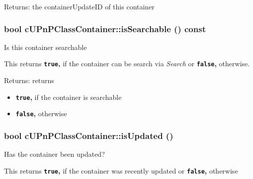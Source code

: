 \begin{Desc}
\item[Returns:]the containerUpdateID of this container \end{Desc}
\hypertarget{classcUPnPClassContainer_c6d1de26df91d64379a9a2db1f5a7301}{
\subsubsection[{isSearchable}]{\setlength{\rightskip}{0pt plus 5cm}bool cUPnPClassContainer::isSearchable () const}}
\label{classcUPnPClassContainer_c6d1de26df91d64379a9a2db1f5a7301}


Is this container searchable

This returns {\bf {\tt true},} if the container can be search via {\em Search\/} or {\bf {\tt false},} otherwise.

\begin{Desc}
\item[Returns:]returns\begin{itemize}
\item {\bf {\tt true},} if the container is searchable\item {\bf {\tt false},} otherwise \end{itemize}
\end{Desc}
\hypertarget{classcUPnPClassContainer_a8ae4e790074d3a34bc7ec173a02595a}{
\subsubsection[{isUpdated}]{\setlength{\rightskip}{0pt plus 5cm}bool cUPnPClassContainer::isUpdated ()}}
\label{classcUPnPClassContainer_a8ae4e790074d3a34bc7ec173a02595a}


Has the container been updated?

This returns {\bf {\tt true},} if the container was recently updated or {\bf {\tt false},} otherwise

